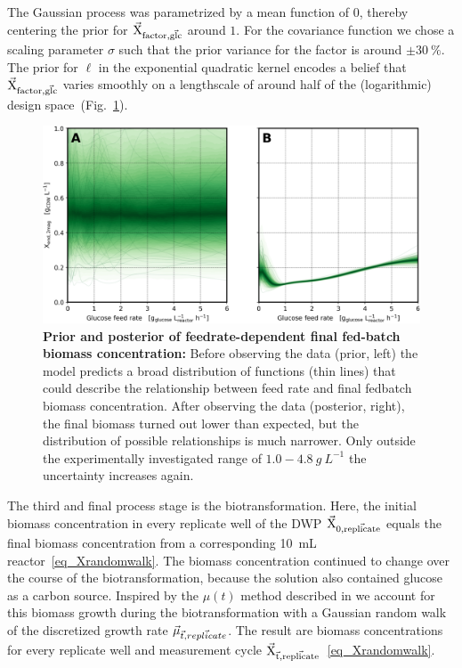 \documentclass[sn-standardnature]{sn-jnl}%
\def\vec{\mathaccent "017E\relax }
\theoremstyle{thmstyleone}%
\theoremstyle{thmstyletwo}%
\theoremstyle{thmstylethree}%
\begin{document}
The Gaussian process was parametrized by a mean function of $0$, thereby centering the prior for $\mathrm{\vec{X}_{factor,\vec{glc}}}$ around $1$.
For the covariance function we chose a scaling parameter $\sigma$ such that the prior variance for the factor is around $\pm30\ \%$.
The prior for $\ell$ in the exponential quadratic kernel encodes a belief that $\mathrm{\vec{X}_{factor,\vec{glc}}}$ varies smoothly on a lengthscale of around half of the (logarithmic) design space~(Fig.~\ref{fig_gpXfactor}).

\begin{figure}[h]
    \centering
    \includegraphics[width=1.0\textwidth]{figures/plot_gp_X_factor.png}
    \caption{
        \textbf{Prior and posterior of feedrate-dependent final fed-batch biomass concentration:}
        Before observing the data (prior, left) the model predicts a broad distribution of functions (thin lines) that could describe the relationship between feed rate and final fedbatch biomass concentration.
        After observing the data (posterior, right), the final biomass turned out lower than expected, but the distribution of possible relationships is much narrower.
        Only outside the experimentally investigated range of $1.0-4.8\ g\ L^{-1}$ the uncertainty increases again.
    }
    \label{fig_gpXfactor}
\end{figure}

The third and final process stage is the biotransformation.
Here, the initial biomass concentration in every replicate well of the DWP $\mathrm{\vec{X}_{0,\vec{replicate}}}$ equals the final biomass concentration from a corresponding 10~mL reactor~\eqref{eq_Xrandomwalk}.
The biomass concentration continued to change over the course of the biotransformation, because the solution also contained glucose as a carbon source.
Inspired by the $\mu(t)$ method described in \cite{bletlPaper} we account for this biomass growth during the biotransformation with a Gaussian random walk of the discretized growth rate $\vec{\mu}_{\vec{t},\vec{replicate}}$.
The result are biomass concentrations for every replicate well and measurement cycle $\mathrm{\vec{X}_{\vec{t},\vec{replicate}}}$~\eqref{eq_Xrandomwalk}.
\end{document}
